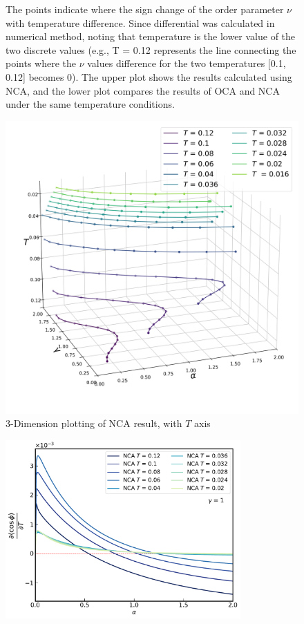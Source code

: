 \documentclass{article}[12pt]
\begin{document}
\begin{spacing}{1.3}
\begin{figure}[H]
  \caption{The points indicate where the sign change of the order parameter $\nu$ with temperature difference. Since differential was calculated in numerical method, noting that temperature is the lower value of the two discrete values 
  (e.g., T = 0.12 represents the line connecting the points where the $\nu$ values 
  difference for the two temperatures [0.1, 0.12] becomes 0). The upper plot shows the results calculated using NCA, 
  and the lower plot compares the results of OCA and NCA under the same temperature conditions.}
   \label{2Dplot}
\end{figure}
\begin{figure}[H]
  \centerline{\includegraphics[width=13cm]{TexFigure/4/4_3_10_3dplot_Ns3_proj_20-1.png}}
  \caption{3-Dimension plotting of NCA result, with $T$ axis}%
\end{figure}
\pagebreak
\begin{figure}[H]
  \vfill
  \centering
  \centerline{\includegraphics[width=9cm]{TexFigure/4/4_3_11_0.pdf}}

\end{figure}
\end{spacing}
\end{document}
